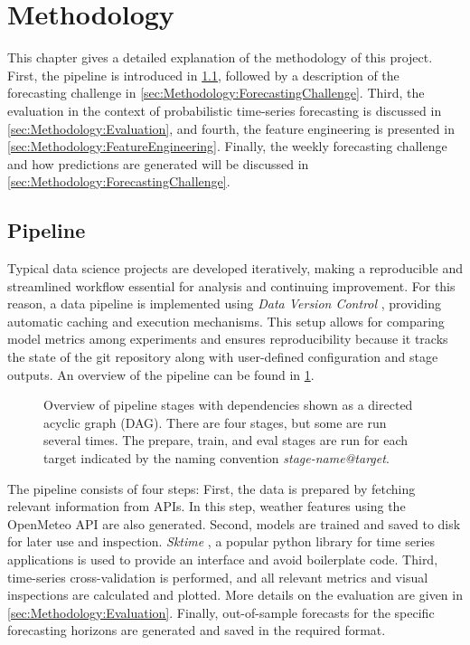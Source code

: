 \newpage
\section{Methodology}
\label{ch:Methodology}

This chapter gives a detailed explanation of the methodology of this project. First, the pipeline is introduced in \cref{sec:Methodology:Pipeline}, followed by a description of the forecasting challenge in \cref{sec:Methodology:ForecastingChallenge}. Third, the evaluation in the context of probabilistic time-series forecasting is discussed in \cref{sec:Methodology:Evaluation}, and fourth, the feature engineering is presented in \cref{sec:Methodology:FeatureEngineering}.
Finally, the weekly forecasting challenge and how predictions are generated will be discussed in \cref{sec:Methodology:ForecastingChallenge}.


\subsection{Pipeline}
\label{sec:Methodology:Pipeline}

Typical data science projects are developed iteratively, making a reproducible and streamlined workflow essential for analysis and continuing improvement. For this reason, a data pipeline is implemented using \textit{Data Version Control} \parencite{ruslan_kuprieiev_dvc_2024}, providing automatic caching and execution mechanisms. This setup allows for comparing model metrics among experiments and ensures reproducibility because it tracks the state of the git repository along with user-defined configuration and stage outputs. An overview of the pipeline can be found in \cref{fig:pipeline}.
\begin{figure}[htbp]
  \centering
  
  \caption{Overview of pipeline stages with dependencies shown as a directed acyclic graph (DAG). There are four stages, but some are run several times. The prepare, train, and eval stages are run for each target indicated by the naming convention \textit{stage-name@target}.} 
  \label{fig:pipeline}
\end{figure}
The pipeline consists of four steps: First, the data is prepared by fetching relevant information from APIs. In this step, weather features using the OpenMeteo API are also generated. Second, models are trained and saved to disk for later use and inspection. \textit{Sktime} \parencite{franz_kiraly_sktimesktime_2024}, a popular python library for time series applications is used to provide an interface and avoid boilerplate code. Third, time-series cross-validation is performed, and all relevant metrics and visual inspections are calculated and plotted. More details on the evaluation are given in \cref{sec:Methodology:Evaluation}. Finally, out-of-sample forecasts for the specific forecasting horizons are generated and saved in the required format.

